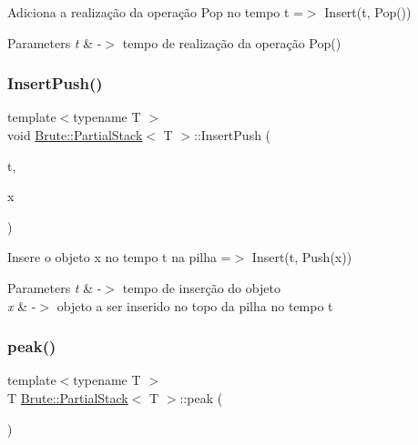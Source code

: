 Adiciona a realização da operação Pop no tempo t =$>$ Insert(t, Pop())


\begin{DoxyParams}{Parameters}
{\em t} & -\/$>$ tempo de realização da operação Pop() \\
\hline
\end{DoxyParams}
\mbox{\label{classBrute_1_1PartialStack_a9b35f39e3d2a3b6af1599dfe8a9dc83d}} 
\subsubsection{\texorpdfstring{Insert\+Push()}{InsertPush()}}
{\footnotesize\ttfamily template$<$typename T $>$ \\
void \hyperlink{classBrute_1_1PartialStack}{Brute\+::\+Partial\+Stack}$<$ T $>$\+::Insert\+Push (\begin{DoxyParamCaption}\item[{int}]{t,  }\item[{const T \&}]{x }\end{DoxyParamCaption})}

Insere o objeto x no tempo t na pilha =$>$ Insert(t, Push(x))


\begin{DoxyParams}{Parameters}
{\em t} & -\/$>$ tempo de inserção do objeto \\
\hline
{\em x} & -\/$>$ objeto a ser inserido no topo da pilha no tempo t \\
\hline
\end{DoxyParams}
\mbox{\label{classBrute_1_1PartialStack_a75cea8d95032298fabb08de150190045}} 
\subsubsection{\texorpdfstring{peak()}{peak()}}
{\footnotesize\ttfamily template$<$typename T $>$ \\
T \hyperlink{classBrute_1_1PartialStack}{Brute\+::\+Partial\+Stack}$<$ T $>$\+::peak (\begin{DoxyParamCaption}{ }\end{DoxyParamCaption})}

